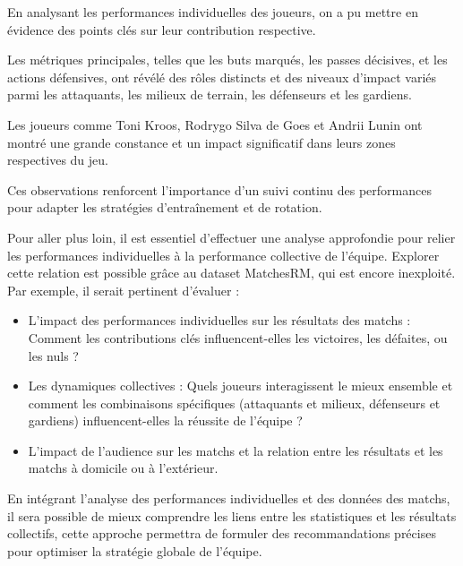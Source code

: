 \documentclass[
  6pt,
]{article}
\begin{document}
En analysant les performances individuelles des joueurs, on a pu mettre
en évidence des points clés sur leur contribution respective.

Les métriques principales, telles que les buts marqués, les passes
décisives, et les actions défensives, ont révélé des rôles distincts et
des niveaux d'impact variés parmi les attaquants, les milieux de
terrain, les défenseurs et les gardiens.

Les joueurs comme Toni Kroos, Rodrygo Silva de Goes et Andrii Lunin ont
montré une grande constance et un impact significatif dans leurs zones
respectives du jeu.

Ces observations renforcent l'importance d'un suivi continu des
performances pour adapter les stratégies d'entraînement et de rotation.

Pour aller plus loin, il est essentiel d'effectuer une analyse
approfondie pour relier les performances individuelles à la performance
collective de l'équipe. Explorer cette relation est possible grâce au
dataset MatchesRM, qui est encore inexploité. Par exemple, il serait
pertinent d'évaluer :

\begin{itemize}
\item
  L'impact des performances individuelles sur les résultats des matchs :
  Comment les contributions clés influencent-elles les victoires, les
  défaites, ou les nuls ?
\item
  Les dynamiques collectives : Quels joueurs interagissent le mieux
  ensemble et comment les combinaisons spécifiques (attaquants et
  milieux, défenseurs et gardiens) influencent-elles la réussite de
  l'équipe ?
\item
  L'impact de l'audience sur les matchs et la relation entre les
  résultats et les matchs à domicile ou à l'extérieur.
\end{itemize}

En intégrant l'analyse des performances individuelles et des données des
matchs, il sera possible de mieux comprendre les liens entre les
statistiques et les résultats collectifs, cette approche permettra de
formuler des recommandations précises pour optimiser la stratégie
globale de l'équipe.
\end{document}
